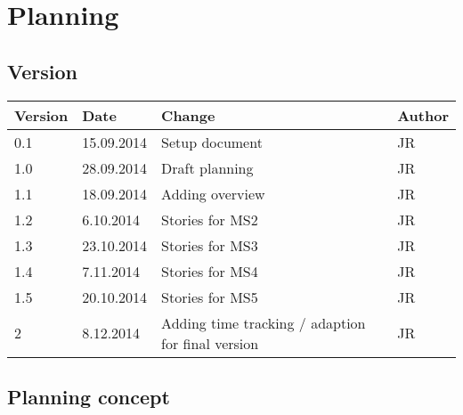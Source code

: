 


\chapter{Planning} %

\label{Planning} %



\section{Version}

\begin{tabular}{| p{1.5cm} | p{2cm} | p{9cm} | p{1.5cm} |}
    \hline
    Version & Date      & Change & Author \\ \hline
    0.1     & 15.09.2014        & Setup document                                        & JR \\ \hline
    1.0     & 28.09.2014        & Draft planning                                        & JR \\ \hline
    1.1     & 18.09.2014        & Adding overview                                       & JR \\ \hline
    1.2     & 6.10.2014        & Stories for MS2                                       & JR \\ \hline
    1.3     & 23.10.2014        & Stories for MS3                                      & JR \\ \hline
    1.4     & 7.11.2014        & Stories for MS4                                       & JR \\ \hline
    1.5     & 20.10.2014        & Stories for MS5                                       & JR \\ \hline
    2       & 8.12.2014        & Adding time tracking / adaption for final version     & JR \\ \hline


\end{tabular}

\section{Planning concept}

